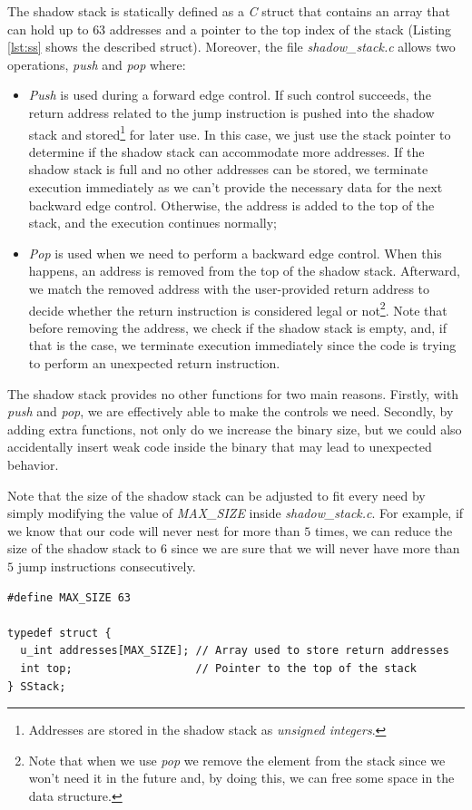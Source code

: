 The shadow stack is statically defined as a \textit{C} struct that contains an
array that can hold up to $63$ addresses and a pointer to the top index of the
stack (Listing \ref{lst:ss} shows the described struct). Moreover, the file
\textit{shadow\_stack.c} allows two operations, \textit{push} and \textit{pop}
where:
\begin{itemize}
  \item \textit{Push} is used during a forward edge control. If such control succeeds,
    the return address related to the jump instruction is pushed into the shadow
    stack and stored\footnote{Addresses are stored in the shadow stack as
    \textit{unsigned integers}.} for later use. In this case, we just use the stack
    pointer to determine if the shadow stack can accommodate more addresses. If
    the shadow stack is full and no other addresses can be stored, we terminate execution
    immediately as we can't provide the necessary data for the next backward edge
    control. Otherwise, the address is added to the top of the stack, and the
    execution continues normally;

  \item \textit{Pop} is used when we need to perform a backward edge control. When
    this happens, an address is removed from the top of the shadow stack. Afterward,
    we match the removed address with the user-provided return address to decide
    whether the return instruction is considered legal or not\footnote{Note that
    when we use \textit{pop} we remove the element from the stack since we won't
    need it in the future and, by doing this, we can free some space in the data
    structure.}. Note that before removing the address, we check if the shadow stack
    is empty, and, if that is the case, we terminate execution immediately since
    the code is trying to perform an unexpected return instruction.
\end{itemize}

The shadow stack provides no other functions for two main reasons. Firstly, with
\textit{push} and \textit{pop}, we are effectively able to make the controls we need.
Secondly, by adding extra functions, not only do we increase the binary size, but
we could also accidentally insert weak code inside the binary that may lead to unexpected
behavior.

Note that the size of the shadow stack can be adjusted to fit every need by simply
modifying the value of \textit{MAX\_SIZE} inside \textit{shadow\_stack.c}. For
example, if we know that our code will never nest for more than $5$ times, we
can reduce the size of the shadow stack to $6$ since we are sure that we will
never have more than $5$ jump instructions consecutively. \\ \begin{lstlisting}[style=CStyle, caption = shadow stack definition inside \textit{shadow\_stack.c}, label={lst:ss}]
#define MAX_SIZE 63

typedef struct {
  u_int addresses[MAX_SIZE]; // Array used to store return addresses
  int top;                   // Pointer to the top of the stack
} SStack;
\end{lstlisting}


